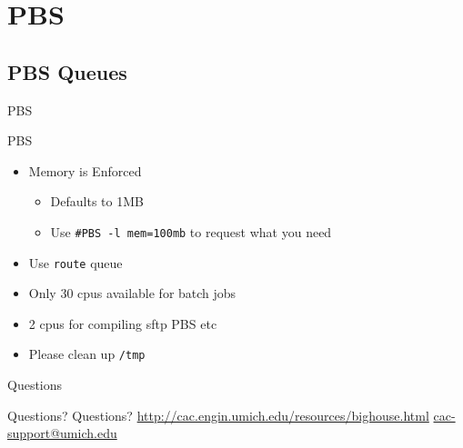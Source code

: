 \documentclass[handout]{beamer}
\begin{document}
\section{PBS}
\subsection{PBS Queues}
\begin{frame}{PBS}
\begin{block}{PBS}
 \begin{itemize}
  \item{Memory is Enforced}
  \begin{itemize}
   \item{Defaults to 1MB}
   \item{Use \texttt{\#PBS -l mem=100mb} to request what you need}
  \end{itemize}
  \item{Use \texttt{route} queue}
  \item{Only 30 cpus available for batch jobs}
  \item{2 cpus for compiling sftp PBS etc}
  \item{Please clean up \texttt{/tmp}}
 \end{itemize}
\end{block}
\end{frame}
\begin{frame}{Questions}
 \begin{block}{Questions?}
 Questions?
 \url{http://cac.engin.umich.edu/resources/bighouse.html}
 \url{cac-support@umich.edu}
 \end{block}
\end{frame}
\end{document}
